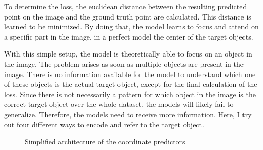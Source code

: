 To determine the loss, the euclidean distance between the resulting predicted point on the image and the ground truth point are calculated.
This distance is learned to be minimized.
By doing that, the model learns to focus and attend on a specific part in the image, in a perfect model the center of the target objects.

With this simple setup, the model is theoretically able to focus on an object in the image.
The problem arises as soon as multiple objects are present in the image.
There is no information available for the model to understand which one of these objects is the actual target object, except for the final calculation of the loss.
Since there is not necessarily a pattern for which object in the image is the correct target object over the whole dataset, the models will likely fail to generalize.
Therefore, the models need to receive more information.
Here, I try out four different ways to encode and refer to the target object.

\begin{figure}[h]
    \centering
    \caption{Simplified architecture of the coordinate predictors}
\end{figure}

